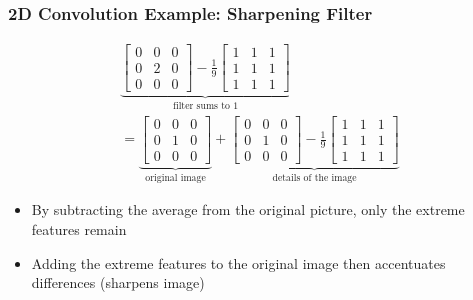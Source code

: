 \documentclass[letterpaper,12pt]{article}
\begin{document}
\subsubsection{2D Convolution Example: Sharpening Filter}
\begin{align}
 \underbrace{\begin{bmatrix}
   0 & 0 & 0 \\
   0 & 2 & 0 \\
   0 & 0 & 0
  \end{bmatrix}
 -\frac{1}{9}\begin{bmatrix}
   1 & 1 & 1 \\
   1 & 1 & 1 \\
   1 & 1 & 1
  \end{bmatrix}}_\text{filter sums to 1} \\
 = \underbrace{\begin{bmatrix}
   0 & 0 & 0 \\
   0 & 1 & 0 \\
   0 & 0 & 0
  \end{bmatrix}}_\text{original image}
 +\underbrace{\begin{bmatrix}
   0 & 0 & 0 \\
   0 & 1 & 0 \\
   0 & 0 & 0
  \end{bmatrix}
  -\frac{1}{9}\begin{bmatrix}
   1 & 1 & 1 \\
   1 & 1 & 1 \\
   1 & 1 & 1
  \end{bmatrix}}_\text{details of the image}
 \tag{Blurs image}
\end{align}
\begin{itemize}
 \item By subtracting the average from the original picture, only the extreme features remain
 \item Adding the extreme features to the original image then accentuates differences (sharpens image)
\end{itemize}
\end{document}
